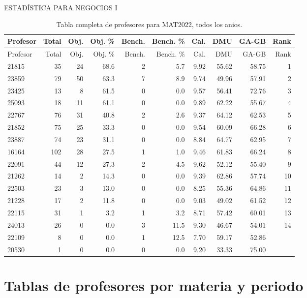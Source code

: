 ESTADÍSTICA PARA NEGOCIOS I

\begingroup
\scriptsize
\setlength{\tabcolsep}{3pt}
\begin{longtable}{lrrrrrrrrr}
\caption{Tabla completa de profesores para MAT2022, todos los anios.}\label{tab:prof-global-mat2022}\\
\toprule
Profesor & Total & Obj. & Obj. \% & Bench. & Bench. \% & Cal. & DMU & GA-GB & Rank \\
\midrule
\endfirsthead
\toprule
Profesor & Total & Obj. & Obj. \% & Bench. & Bench. \% & Cal. & DMU & GA-GB & Rank \\
\midrule
\endhead
21815 & 35 & 24 & 68.6 & 2 & 5.7 & 9.92 & 55.62 & 58.75 & 1 \\
23859 & 79 & 50 & 63.3 & 7 & 8.9 & 9.74 & 49.96 & 57.91 & 2 \\
23425 & 13 & 8 & 61.5 & 0 & 0.0 & 9.57 & 56.41 & 72.76 & 3 \\
25093 & 18 & 11 & 61.1 & 0 & 0.0 & 9.89 & 62.22 & 55.67 & 4 \\
22767 & 76 & 31 & 40.8 & 2 & 2.6 & 9.37 & 64.12 & 62.53 & 5 \\
21852 & 75 & 25 & 33.3 & 0 & 0.0 & 9.54 & 60.09 & 66.28 & 6 \\
23887 & 74 & 23 & 31.1 & 0 & 0.0 & 8.84 & 64.77 & 62.95 & 7 \\
16164 & 102 & 28 & 27.5 & 1 & 1.0 & 9.46 & 61.83 & 66.24 & 8 \\
22091 & 44 & 12 & 27.3 & 2 & 4.5 & 9.62 & 52.12 & 55.40 & 9 \\
21262 & 14 & 2 & 14.3 & 0 & 0.0 & 9.39 & 62.86 & 57.74 & 10 \\
22503 & 23 & 3 & 13.0 & 0 & 0.0 & 8.25 & 55.36 & 64.86 & 11 \\
21228 & 17 & 2 & 11.8 & 0 & 0.0 & 9.03 & 49.02 & 61.52 & 12 \\
22115 & 31 & 1 & 3.2 & 1 & 3.2 & 8.71 & 57.42 & 60.01 & 13 \\
24013 & 26 & 0 & 0.0 & 3 & 11.5 & 9.30 & 46.67 & 54.01 & 14 \\
22109 & 8 & 0 & 0.0 & 1 & 12.5 & 7.70 & 59.17 & 52.86 &  \\
20530 & 1 & 0 & 0.0 & 0 & 0.0 & 9.20 & 33.33 & 75.00 &  \\
\bottomrule
\end{longtable}
\endgroup

\clearpage

\section{Tablas de profesores por materia y periodo}

